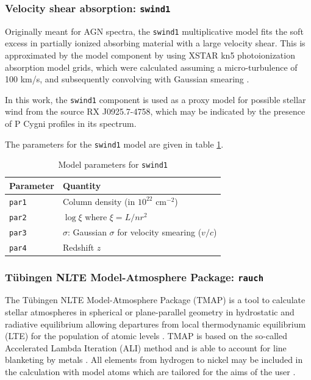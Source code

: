 			\subsubsection{Velocity shear absorption: \texttt{swind1}}
				Originally meant for AGN spectra, the \texttt{swind1} multiplicative model fits the soft excess in partially ionized absorbing material with a large velocity shear. This is approximated by the model component by using XSTAR kn5 photoionization absorption model grids, which were calculated assuming a micro-turbulence of 100 km/s, and subsequently convolving with Gaussian smearing \cite{swind1}.
				
				In this work, the \texttt{swind1} component is used as a proxy model for possible stellar wind from the source RX J0925.7-4758, which may be indicated by the presence of P Cygni profiles in its spectrum.
				
				The parameters for the \texttt{swind1} model are given in table \ref{param:swind1}.
				\begin{table}[h!]
					\centering
					\caption{Model parameters for \texttt{swind1}}
					\label{param:swind1}
					\begin{tabular}{p{}p{}}
						\hline
						\textbf{Parameter} & \textbf{Quantity} \\ \hline
						{\texttt{par1}} & {Column density (in $10^{22}$ cm$^{-2}$)} \\ %
						{\texttt{par2}} & {$\log{\xi}$ where $\xi=L/nr^2$} \\ %
						{\texttt{par3}} & {$\sigma$: Gaussian $\sigma$ for velocity smearing ($v/c$)} \\ %
						{\texttt{par4}} & {Redshift $z$} \\ \hline
					\end{tabular}
				\end{table}
			
			\subsubsection{T\"{u}bingen NLTE Model-Atmosphere Package: \texttt{rauch}}
				The T\"{u}bingen NLTE Model-Atmosphere Package (TMAP) is a tool to calculate stellar atmospheres in spherical or plane-parallel geometry in hydrostatic and radiative equilibrium allowing departures from local thermodynamic equilibrium (LTE) for the population of atomic levels \cite{werner1999classical}. TMAP is based on the so-called Accelerated Lambda Iteration (ALI) method and is able to account for line blanketing by metals \cite{rauchALI}. All elements from hydrogen to nickel may be included in the calculation with model atoms which are tailored for the aims of the user \cite{wernerTMAP}.
				
